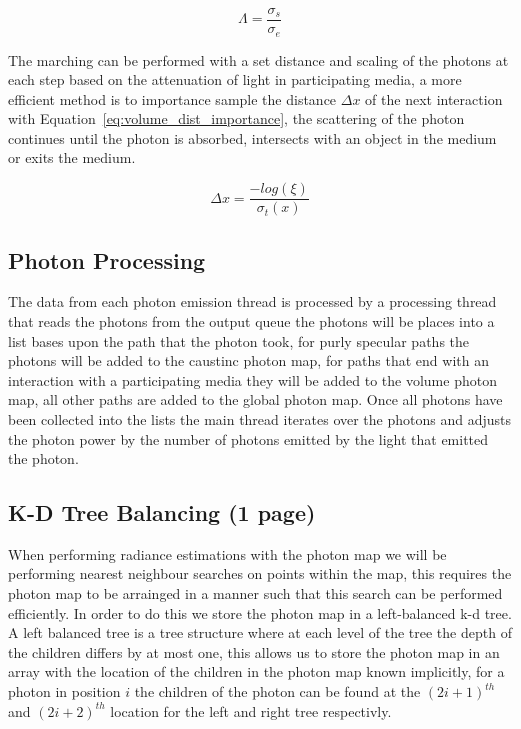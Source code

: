 \begin{equation}
\Lambda = \frac{\sigma_s}{\sigma_e}
\end{equation}

The marching can be performed with a set distance and scaling of the photons at each step based on the attenuation of
light in participating media, a more efficient \cite{JensenBook} method is to importance sample the distance $\Delta x$ of the next interaction with 
Equation~\eqref{eq:volume_dist_importance}, the scattering of the photon continues until the photon is absorbed, intersects
with an object in the medium or exits the medium. 

\begin{equation}
\label{eq:volume_dist_importance}
\Delta x = \frac{-log(\xi)}{\sigma_t(x)}
\end{equation}

\subsection{Photon Processing}
The data from each photon emission thread is processed by a processing thread that reads the photons from the output queue
the photons will be places into a list bases upon the path that the photon took, for purly specular paths the photons
will be added to the caustinc photon map, for paths that end with an interaction with a participating media they will be
added to the volume photon map, all other paths are added to the global photon map. Once all photons have been collected
into the lists the main thread iterates over the photons and adjusts the photon power by the number of photons emitted by
the light that emitted the photon. 

\subsection{K-D Tree Balancing (1 page)}
When performing radiance estimations with the photon map we will be performing nearest neighbour searches on points within
the map, this requires the photon map to be arrainged in a manner such that this search can be performed efficiently.
In order to do this we store the photon map in a left-balanced k-d tree. A left balanced tree is a tree structure where
at each level of the tree the depth of the children differs by at most one,
this allows us to store the photon map in an array with the location of the children in the photon map known implicitly,
for a photon in position $i$ the children of the photon can be found at the $(2i + 1)^{th}$ and $(2i + 2)^{th}$
location for the left and right tree respectivly.

